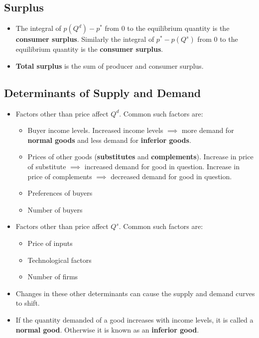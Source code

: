 \documentclass[a4paper]{article}
\begin{document}
\subsection{Surplus}
\begin{itemize}
    \item The integral of $p(Q^d) - p^*$ from $0$ to the equilibrium quantity is the \textbf{consumer surplus}. Similarly the integral of $p^* - p(Q^s)$ from $0$ to the equilibrium quantity is the \textbf{consumer surplus}.  
    \item \textbf{Total surplus} is the sum of producer and consumer surplus. 
\end{itemize}

\subsection{Determinants of Supply and Demand}
\begin{itemize}
    \item Factors other than price affect $Q^d$. Common such factors are:
    \begin{itemize}
        \item Buyer income levels. Increased income levels $\implies$ more demand for \textbf{normal goods} and less demand for \textbf{inferior goods}.
        \item Prices of other goods (\textbf{substitutes} and \textbf{complements}). Increase in price of substitute $\implies$  increased demand for good in question. Increase in price of complements $\implies$  decreased demand for good in question.
        \item Preferences of buyers
        \item Number of buyers
    \end{itemize}
    \item Factors other than price affect $Q^s$. Common such factors are:
    \begin{itemize}
        \item Price of inputs
        \item Technological factors 
        \item Number of firms
    \end{itemize}
    \item Changes in these other determinants can cause the supply and demand curves to shift.
    \item If the quantity demanded of a good increases with income levels, it is called a \textbf{normal good}. Otherwise it is known as an \textbf{inferior good}. 
\end{itemize}
\end{document}
